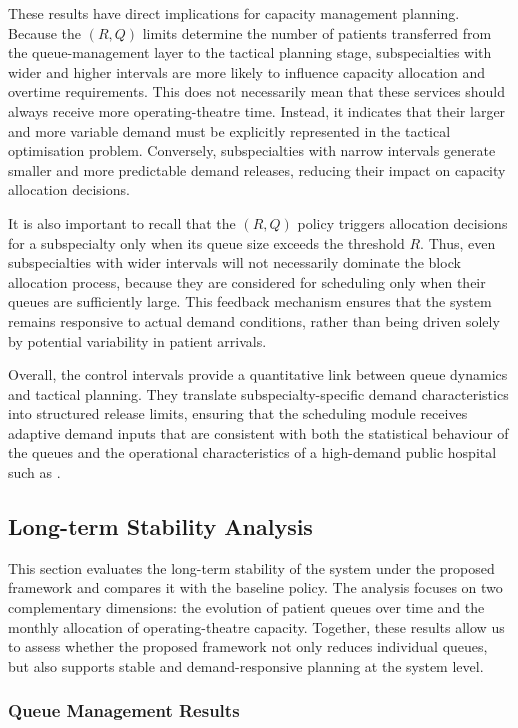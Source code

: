 These results have direct implications for capacity management planning. 
Because the $(R,Q)$ limits determine the number of patients transferred from the queue-management layer to the tactical planning stage, subspecialties with wider and higher intervals are more likely to influence capacity allocation and overtime requirements. 
This does not necessarily mean that these services should always receive more operating-theatre time. 
Instead, it indicates that their larger and more variable demand must be explicitly represented in the tactical optimisation problem. 
Conversely, subspecialties with narrow intervals generate smaller and more predictable demand releases, reducing their impact on capacity allocation decisions.

It is also important to recall that the $(R,Q)$ policy triggers allocation decisions for a subspecialty only when its queue size exceeds the threshold $R$. 
Thus, even subspecialties with wider intervals will not necessarily dominate the block allocation process, because they are considered for scheduling only when their queues are sufficiently large. 
This feedback mechanism ensures that the system remains responsive to actual demand conditions, rather than being driven solely by potential variability in patient arrivals.

Overall, the control intervals provide a quantitative link between queue dynamics and tactical planning. 
They translate subspecialty-specific demand characteristics into structured release limits, ensuring that the scheduling module receives adaptive demand inputs that are consistent with both the statistical behaviour of the queues and the operational characteristics of a high-demand public hospital such as \hcunicamp.


\subsection{Long-term Stability Analysis\label{sec:otscheduling}}

This section evaluates the long-term stability of the system under the proposed framework and compares it with the baseline policy. 
The analysis focuses on two complementary dimensions: the evolution of patient queues over time and the monthly allocation of operating-theatre capacity. 
Together, these results allow us to assess whether the proposed framework not only reduces individual queues, but also supports stable and demand-responsive planning at the system level.


\subsubsection{Queue Management Results}

